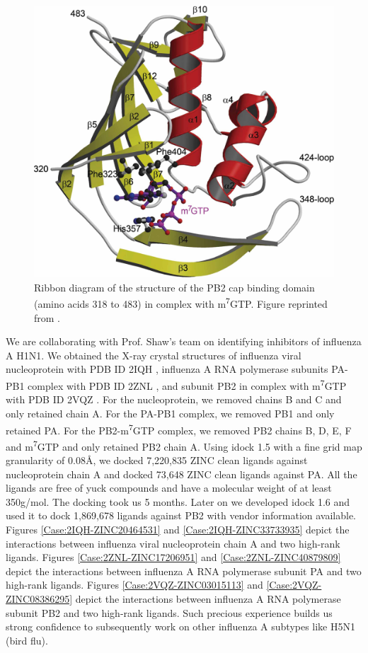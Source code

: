 \begin{figure}
\centering
\includegraphics[width=\linewidth]{Case/InfluenzaPB2.png}
\caption{Ribbon diagram of the structure of the PB2 cap binding domain (amino acids 318 to 483) in complex with m\textsuperscript{7}GTP. Figure reprinted from \citep{1192}.}
\label{Case:InfluenzaPB2}
\end{figure}

We are collaborating with Prof. Shaw's team on identifying inhibitors of influenza A H1N1. We obtained the X-ray crystal structures of influenza viral nucleoprotein with PDB ID 2IQH \citep{1140}, influenza A RNA polymerase subunits PA-PB1 complex with PDB ID 2ZNL \citep{1141}, and subunit PB2 in complex with m\textsuperscript{7}GTP with PDB ID 2VQZ \citep{1192}. For the nucleoprotein, we removed chains B and C and only retained chain A. For the PA-PB1 complex, we removed PB1 and only retained PA. For the PB2-m\textsuperscript{7}GTP complex, we removed PB2 chains B, D, E, F and m\textsuperscript{7}GTP and only retained PB2 chain A. Using idock 1.5 with a fine grid map granularity of 0.08\AA, we docked 7,220,835 ZINC \citep{532} clean ligands against nucleoprotein chain A and docked 73,648 ZINC clean ligands against PA. All the ligands are free of yuck compounds and have a molecular weight of at least 350g/mol. The docking took us 5 months. Later on we developed idock 1.6 and used it to dock 1,869,678 ligands against PB2 with vendor information available. Figures \ref{Case:2IQH-ZINC20464531} and \ref{Case:2IQH-ZINC33733935} depict the interactions between influenza viral nucleoprotein chain A and two high-rank ligands. Figures \ref{Case:2ZNL-ZINC17206951} and \ref{Case:2ZNL-ZINC40879809} depict the interactions between influenza A RNA polymerase subunit PA and two high-rank ligands. Figures \ref{Case:2VQZ-ZINC03015113} and \ref{Case:2VQZ-ZINC08386295} depict the interactions between influenza A RNA polymerase subunit PB2 and two high-rank ligands. Such precious experience builds us strong confidence to subsequently work on other influenza A subtypes like H5N1 (bird flu).


